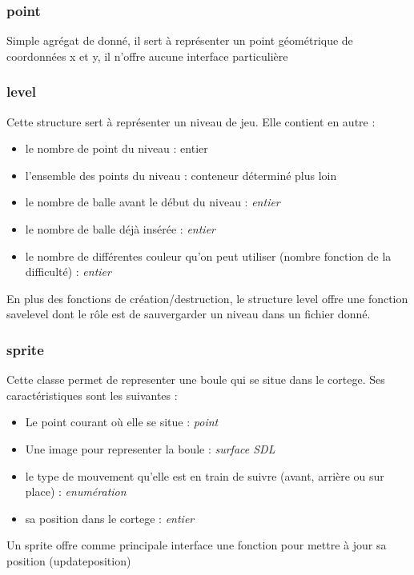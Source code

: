 \subsubsection{point}
Simple agrégat de donné, il sert à représenter un point géométrique de
coordonnées x et y, il n'offre aucune interface particulière

\subsubsection{level}
Cette structure sert à représenter un niveau de jeu. Elle contient en autre : 
\begin{itemize}
  \item le nombre de point du niveau : entier
  \item l'ensemble des points du niveau : conteneur déterminé plus loin
  \item le nombre de balle avant le début du niveau : \textit{entier}
  \item le nombre de balle déjà insérée : \textit{entier}
  \item le nombre de différentes couleur qu'on peut utiliser (nombre
    fonction de la difficulté) : \textit{entier}
\end{itemize}

En plus des fonctions de création/destruction, le structure level
offre une fonction save\textunderscore level dont le rôle est de
sauvergarder un niveau dans un fichier donné.

\subsubsection{sprite}
Cette classe permet de representer une boule qui se situe dans le
cortege. Ses caractéristiques sont les suivantes : 
\begin{itemize}
  \item Le point courant où elle se situe : \textit{point}
  \item Une image pour representer la boule : \textit{surface SDL}
  \item le type de mouvement qu'elle est en train de suivre (avant,
    arrière ou sur place) : \textit{enumération}
  \item sa position dans le cortege : \textit{entier}
\end{itemize}

Un sprite offre comme principale interface une fonction pour mettre à
jour sa position (update\textunderscore position)

